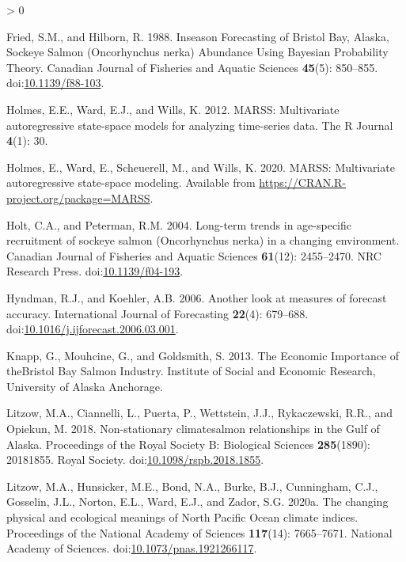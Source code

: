 \documentclass[
]{article}
\newlength{\cslhangindent}
\newenvironment{CSLReferences}[2] %
 {%
  \setlength{\parindent}{0pt}
  \ifodd #1 \everypar{\setlength{\hangindent}{\cslhangindent}}\ignorespaces\fi
  \ifnum #2 > 0
  \setlength{\parskip}{#2\baselineskip}
  \fi
 }%
 {}
\begin{document}
\begin{CSLReferences}{1}{0}
\leavevmode\hypertarget{ref-fried1988}{}%
Fried, S.M., and Hilborn, R. 1988. Inseason {Forecasting} of {Bristol Bay}, {Alaska}, {Sockeye Salmon} ({Oncorhynchus} nerka) {Abundance Using Bayesian Probability Theory}. Canadian Journal of Fisheries and Aquatic Sciences \textbf{45}(5): 850--855. doi:\href{https://doi.org/10.1139/f88-103}{10.1139/f88-103}.

\leavevmode\hypertarget{ref-holmes2012}{}%
Holmes, E.E., Ward, E.J., and Wills, K. 2012. MARSS: Multivariate autoregressive state-space models for analyzing time-series data. The R Journal \textbf{4}(1): 30.

\leavevmode\hypertarget{ref-holmes2020}{}%
Holmes, E., Ward, E., Scheuerell, M., and Wills, K. 2020. MARSS: Multivariate autoregressive state-space modeling. Available from \url{https://CRAN.R-project.org/package=MARSS}.

\leavevmode\hypertarget{ref-holt2004}{}%
Holt, C.A., and Peterman, R.M. 2004. Long-term trends in age-specific recruitment of sockeye salmon ({Oncorhynchus} nerka) in a changing environment. Canadian Journal of Fisheries and Aquatic Sciences \textbf{61}(12): 2455--2470. {NRC Research Press}. doi:\href{https://doi.org/10.1139/f04-193}{10.1139/f04-193}.

\leavevmode\hypertarget{ref-hyndman2006}{}%
Hyndman, R.J., and Koehler, A.B. 2006. Another look at measures of forecast accuracy. International Journal of Forecasting \textbf{22}(4): 679--688. doi:\href{https://doi.org/10.1016/j.ijforecast.2006.03.001}{10.1016/j.ijforecast.2006.03.001}.

\leavevmode\hypertarget{ref-knapp2013}{}%
Knapp, G., Mouhcine, G., and Goldsmith, S. 2013. The {Economic Importance} of {theBristol Bay Salmon Industry}. {Institute of Social and Economic Research}, {University of Alaska Anchorage}.

\leavevmode\hypertarget{ref-litzow2018}{}%
Litzow, M.A., Ciannelli, L., Puerta, P., Wettstein, J.J., Rykaczewski, R.R., and Opiekun, M. 2018. Non-stationary climate{}salmon relationships in the {Gulf} of {Alaska}. Proceedings of the Royal Society B: Biological Sciences \textbf{285}(1890): 20181855. {Royal Society}. doi:\href{https://doi.org/10.1098/rspb.2018.1855}{10.1098/rspb.2018.1855}.

\leavevmode\hypertarget{ref-litzow2020a}{}%
Litzow, M.A., Hunsicker, M.E., Bond, N.A., Burke, B.J., Cunningham, C.J., Gosselin, J.L., Norton, E.L., Ward, E.J., and Zador, S.G. 2020a. The changing physical and ecological meanings of {North Pacific Ocean} climate indices. Proceedings of the National Academy of Sciences \textbf{117}(14): 7665--7671. {National Academy of Sciences}. doi:\href{https://doi.org/10.1073/pnas.1921266117}{10.1073/pnas.1921266117}.


\end{CSLReferences}
\end{document}
